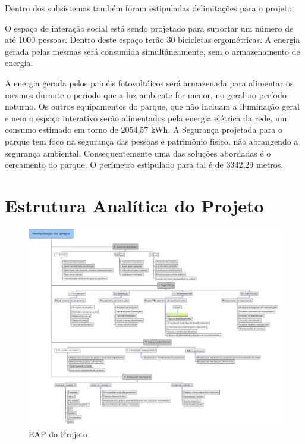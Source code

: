 	Dentro dos subsistemas também foram estipuladas delimitações para o projeto: 

	O espaço de interação social está sendo projetado para suportar um número de até 1000 pessoas. Dentro deste espaço terão 30 bicicletas ergométricas. A energia gerada pelas mesmas será consumida simultâneamente, sem o armazenamento de energia. 

	A energia gerada pelos painéis fotovoltáicos será armazenada para alimentar os mesmos durante o período que a luz ambiente for menor, no geral no período noturno. Os outros equipamentos do parque, que não incluam a iluminação geral e nem o espaço interativo serão alimentados pela energia elétrica da rede, um consumo estimado em torno de  2054,57 kWh. A Segurança projetada para o parque tem foco na segurança das pessoas e patrimônio físico, não abrangendo a segurança ambiental. Consequentemente uma das soluções abordadas é o cercamento do parque. O perímetro estipulado para tal é de 3342,29 metros. 


\section{Estrutura Anal\'itica do Projeto}

\begin{figure}[h]
	\centering
	\label{EAP}
		\includegraphics[keepaspectratio=true,scale=0.9,angle=270]{figuras/EAP-GERAL.png}
	\caption{EAP do Projeto}
\end{figure}


	